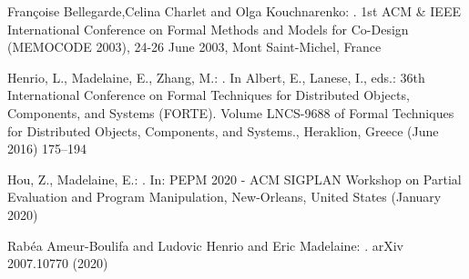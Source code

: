 \documentclass[11pt,fleqn]{article}
\begin{document}
\begin{thebibliography}{9}

Fran{\c{c}}oise Bellegarde,Celina Charlet and Olga Kouchnarenko:
.
\newblock 1st {ACM} {\&} {IEEE} International Conference on Formal Methods and Models for Co-Design {(MEMOCODE} 2003), 24-26 June 2003, Mont Saint-Michel, France

Henrio, L., Madelaine, E., Zhang, M.:
.
\newblock In Albert, E., Lanese, I., eds.: {36th International Conference on
  Formal Techniques for Distributed Objects, Components, and Systems (FORTE)}.
  Volume LNCS-9688 of Formal Techniques for Distributed Objects, Components,
  and Systems., Heraklion, Greece (June 2016)  175--194

Hou, Z., Madelaine, E.:
.
\newblock In: {PEPM 2020 - ACM SIGPLAN Workshop on Partial Evaluation and
  Program Manipulation}, New-Orleans, United States (January 2020)

Rabéa Ameur-Boulifa and Ludovic Henrio and Eric Madelaine:
.
\newblock arXiv {2007.10770} (2020)
\end{thebibliography}
\end{document}
